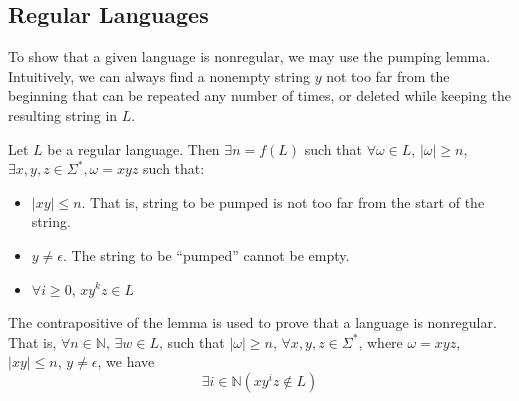 \subsection{Regular Languages}
To show that a given language is nonregular, we may use the pumping lemma.
Intuitively, we can always find a nonempty string $y$ not too far from the
beginning that can be repeated any number of times, or deleted while keeping
the resulting string in $L$.
\begin{lemma}
  Let $L$ be a regular language. Then $\exists n=f(L)$ such that $\forall\omega\in L$,
  $\left| \omega \right| \ge n$, $\exists x,y,z\in \Sigma^{*},\omega=xyz$ such that:
  \begin{itemize}
    \item $\left| xy \right| \le n$. That is, string to be pumped is not too
      far from the start of the string.
    \item $y\neq\epsilon$. The string to be ``pumped'' cannot be empty.
    \item $\forall i\ge 0$, $xy^{k}z\in L$
  \end{itemize}
\end{lemma}
The contrapositive of the lemma is used to prove that a language is
nonregular. That is, $\forall n\in \mathbb{N}$, $\exists w\in L$, such that
$\left| \omega \right| \ge n$, $\forall x,y,z\in \Sigma^{*}$, where $\omega=xyz$,
$\left| xy \right| \le n$, $y\neq\epsilon$, we have
\[\exists i\in \mathbb{N}\left( xy^{i}z\notin L \right)\]
